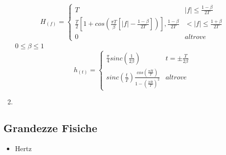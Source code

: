 \begin{enumerate}
{            \[
                  H_{(f)} = 
                  \begin{cases}
                    T     &|f|\leq \frac{1-\beta}{2T} \nonumber \\
                    \frac{T}{2}\left[1+cos\left(\frac{\pi T}{\beta}\left[|f|-\frac{1-\beta}{2T}\right]\right)\right],\frac{1-\beta}{2T}&<|f|\leq\frac{1+\beta}{2T}\nonumber \\
                    0 &altrove\nonumber  
                  \end{cases}
            \]
            $0\leq\beta\leq 1$
            \[
                  h_{(t)} = 
                  \begin{cases}
                    \frac{\pi}{4}sinc\left(\frac{1}{2\beta}\right)    &t=\pm \frac{T}{2\beta} \nonumber \\
                    sinc\left(\frac{t}{T}\right)\frac{cos\left(\frac{\pi\beta t}{T}\right)}{1-\left(\frac{2\beta t}{T}\right)^2} &altrove\nonumber 
                  \end{cases}
            \]
            \begin{figure}[H]
                \centering
                \hfill
            \end{figure}

        }
        \item {
        }
    \end{enumerate}
    \subsection{Grandezze Fisiche}\label{Grandezze Fisiche}
        \begin{itemize}
            \item {Hertz}
        \end{itemize}


